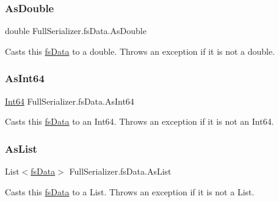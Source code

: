 \subsubsection{\texorpdfstring{As\+Double}{AsDouble}}
{\footnotesize\ttfamily double Full\+Serializer.\+fs\+Data.\+As\+Double\hspace{0.3cm}{\ttfamily [get]}}



Casts this \hyperlink{class_full_serializer_1_1fs_data}{fs\+Data} to a double. Throws an exception if it is not a double. 

\mbox{\label{class_full_serializer_1_1fs_data_a47a5cdaefdb6afc7f2bdaa026befdc00}} 
\subsubsection{\texorpdfstring{As\+Int64}{AsInt64}}
{\footnotesize\ttfamily \hyperlink{namespace_full_serializer_a6eee33d63b94e40fdfcfc59af9fcfc82afbde23b11d7e59af7828e81144c8b487}{Int64} Full\+Serializer.\+fs\+Data.\+As\+Int64\hspace{0.3cm}{\ttfamily [get]}}



Casts this \hyperlink{class_full_serializer_1_1fs_data}{fs\+Data} to an Int64. Throws an exception if it is not an Int64. 

\mbox{\label{class_full_serializer_1_1fs_data_aebf459f479691aa88d9712f53a2d85ee}} 
\subsubsection{\texorpdfstring{As\+List}{AsList}}
{\footnotesize\ttfamily List$<$\hyperlink{class_full_serializer_1_1fs_data}{fs\+Data}$>$ Full\+Serializer.\+fs\+Data.\+As\+List\hspace{0.3cm}{\ttfamily [get]}}



Casts this \hyperlink{class_full_serializer_1_1fs_data}{fs\+Data} to a List. Throws an exception if it is not a List. 

